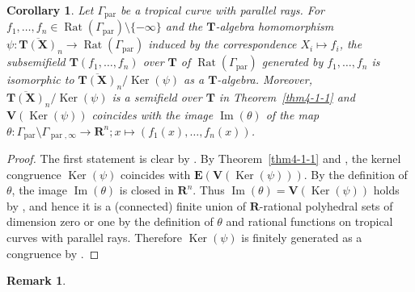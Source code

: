 \documentclass[a4paper,12pt]{amsart}
\newtheorem{cor}[dfn]{Corollary}
\newtheorem{rem}[dfn]{Remark}
\def\Gamma{\varGamma}
\begin{document}
\begin{cor}
    \label{cor4-1-2}
Let $\Gamma_{\operatorname{par}}$ be a tropical curve with parallel rays.
For $f_1, \ldots, f_n \in \operatorname{Rat}(\Gamma_{\operatorname{par}}) \setminus \{ -\infty \}$ and the $\boldsymbol{T}$-algebra homomorphism $\psi : \overline{\boldsymbol{T}(\boldsymbol{X})}_n \to \operatorname{Rat}(\Gamma_{\operatorname{par}})$ induced by the correspondence $X_i \mapsto f_i$, the subsemifield $\boldsymbol{T}(f_1, \ldots, f_n)$ over $\boldsymbol{T}$ of $\operatorname{Rat}(\Gamma_{\operatorname{par}})$ generated by $f_1, \ldots, f_n$ is isomorphic to $\overline{\boldsymbol{T}(\boldsymbol{X})}_n / \operatorname{Ker}(\psi)$ as a $\boldsymbol{T}$-algebra.
Moreover, $\overline{\boldsymbol{T}(\boldsymbol{X})}_n / \operatorname{Ker}(\psi)$ is a semifield over $\boldsymbol{T}$ in Theorem~\ref{thm4-1-1} and $\boldsymbol{V}(\operatorname{Ker}(\psi))$ coincides with the image $\operatorname{Im}(\theta)$ of the map $\theta : \Gamma_{\operatorname{par}} \setminus \Gamma_{\operatorname{par}, \infty} \to \boldsymbol{R}^n; x \mapsto (f_1(x), \ldots, f_n(x))$.
\end{cor}

\begin{proof}
The first statement is clear by \cite[Proposition~2.4.4]{Giansiracusa=Giansiracusa}.
By Theorem~\ref{thm4-1-1} and \cite[Corollary~3.15]{JuAe4}, the kernel congruence $\operatorname{Ker}(\psi)$ coincides with $\boldsymbol{E}(\boldsymbol{V}(\operatorname{Ker}(\psi)))$.
By the definition of $\theta$, the image $\operatorname{Im}(\theta)$ is closed in $\boldsymbol{R}^n$.
Thus $\operatorname{Im}(\theta) = \boldsymbol{V}(\operatorname{Ker}(\psi))$ holds by \cite[Theorem~3.14]{JuAe4}, and hence it is a (connected) finite union of $\boldsymbol{R}$-rational polyhedral sets of dimension zero or one by the definition of $\theta$ and rational functions on tropical curves with parallel rays.
Therefore $\operatorname{Ker}(\psi)$ is finitely generated as a congruence by \cite[Theorem~1.1]{JuAe5}.
\end{proof}

\begin{rem}
    \label{rem4-1-2}
\end{rem}
\end{document}
